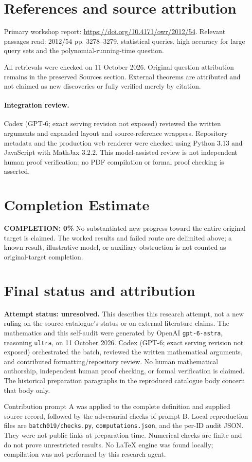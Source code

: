 \documentclass[11pt]{article}
\begin{document}
\section{References and source attribution}
Primary workshop report: \url{https://doi.org/10.4171/owr/2012/54}. Relevant passages read: 2012/54 pp. 3278--3279, statistical queries, high accuracy for large query sets and the polynomial-running-time question.

All retrievals were checked on 11 October 2026. Original question attribution remains in the preserved Sources section. External theorems are attributed and not claimed as new discoveries or fully verified merely by citation.


\paragraph{Integration review.} Codex (GPT-6; exact serving revision not exposed) reviewed the written arguments and expanded layout and source-reference wrappers. Repository metadata and the production web renderer were checked using Python 3.13 and JavaScript with MathJax 3.2.2. This model-assisted review is not independent human proof verification; no PDF compilation or formal proof checking is asserted.

\section{Completion Estimate}
\noindent\textbf{COMPLETION: 0\%}
No substantiated new progress toward the entire original target is claimed. The worked results and failed route are delimited above; a known result, illustrative model, or auxiliary obstruction is not counted as original-target completion.

\section{Final status and attribution}
\textbf{Attempt status: unresolved.} This describes this research attempt, not a new ruling on the source catalogue's status or on external literature claims.
The mathematics and this self-audit were generated by OpenAI \texttt{gpt-6-astra}, reasoning \texttt{ultra}, on 11 October 2026. Codex (GPT-6; exact serving revision not exposed) orchestrated the batch, reviewed the written mathematical arguments, and contributed formatting/repository review. No human mathematical authorship, independent human proof checking, or formal verification is claimed. The historical preparation paragraphs in the reproduced catalogue body concern that body only.

Contribution prompt A was applied to the complete definition and supplied source record, followed by the adversarial checks of prompt B. Local reproduction files are \texttt{batch019/checks.py}, \texttt{computations.json}, and the per-ID audit JSON. They were not public links at preparation time. Numerical checks are finite and do not prove unrestricted results. No LaTeX engine was found locally; compilation was not performed by this research agent.
\end{document}
